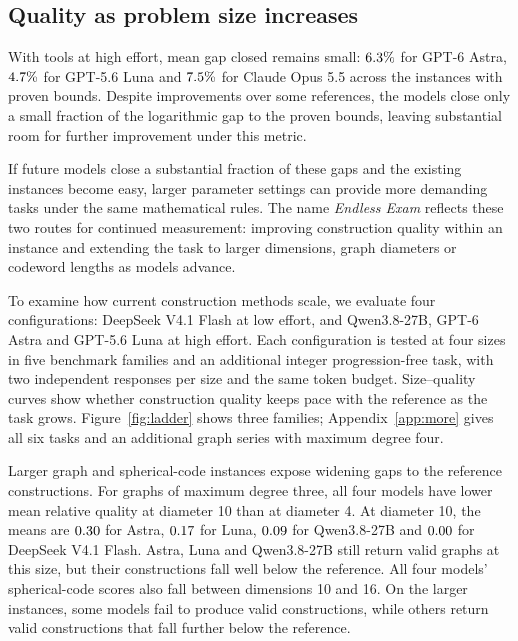 \documentclass{article}
\begin{document}
\subsection{Quality as problem size increases}
\label{sec:ladder}
With tools at high effort, mean gap closed remains small: $6.3\%$ for GPT-6 Astra, $4.7\%$ for GPT-5.6 Luna and $7.5\%$ for Claude Opus 5.5 across the \GapN{} instances with proven bounds. Despite improvements over some references, the models close only a small fraction of the logarithmic gap to the proven bounds, leaving substantial room for further improvement under this metric.

If future models close a substantial fraction of these gaps and the existing instances become easy, larger parameter settings can provide more demanding tasks under the same mathematical rules. The name \emph{Endless Exam} reflects these two routes for continued measurement: improving construction quality within an instance and extending the task to larger dimensions, graph diameters or codeword lengths as models advance.

To examine how current construction methods scale, we evaluate four configurations: DeepSeek V4.1 Flash at low effort, and Qwen3.8-27B, GPT-6 Astra and GPT-5.6 Luna at high effort. Each configuration is tested at four sizes in five benchmark families and an additional integer progression-free task, with two independent responses per size and the same token budget. Size--quality curves show whether construction quality keeps pace with the reference as the task grows. Figure~\ref{fig:ladder} shows three families; Appendix~\ref{app:more} gives all six tasks and an additional graph series with maximum degree four.

Larger graph and spherical-code instances expose widening gaps to the reference constructions. For graphs of maximum degree three, all four models have lower mean relative quality at diameter 10 than at diameter 4. At diameter 10, the means are $0.30$ for Astra, $0.17$ for Luna, $0.09$ for Qwen3.8-27B and $0.00$ for DeepSeek V4.1 Flash. Astra, Luna and Qwen3.8-27B still return valid graphs at this size, but their constructions fall well below the reference. All four models' spherical-code scores also fall between dimensions 10 and 16. On the larger instances, some models fail to produce valid constructions, while others return valid constructions that fall further below the reference.
\end{document}
